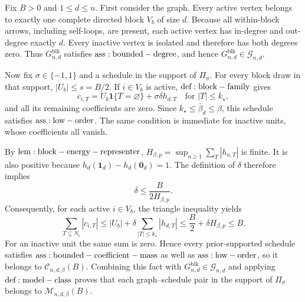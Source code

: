 Fix \(B>0\) and \(1\le d\le n\). First consider the graph. Every active vertex belongs to exactly one complete directed block \(V_b\) of size \(d\). Because all within-block arrows, including self-loops, are present, each active vertex has in-degree and out-degree exactly \(d\). Every inactive vertex is isolated and therefore has both degrees zero. Thus \(G_{n,d}^{\mathrm{blk}}\) satisfies \({\rm ass:bounded-degree}\), and hence \(G_{n,d}^{\mathrm{blk}}\in\mathcal G_{n,d}\).

Now fix \(\sigma\in\{-1,1\}\) and a schedule in the support of \(\Pi_\sigma\). For every block draw in that support, \(|U_b|\le s=B/2\). If \(i\in V_b\) is active, \({\rm def:block-family}\) gives
\[
c_{i,T}=U_b\mathbf 1\{T=\varnothing\}+\sigma\delta h_{d,T}\quad\text{for }|T|\le k_\star,
\]
and all its remaining coefficients are zero. Since \(k_\star\le\bar\beta_d\le\beta\), this schedule satisfies \({\rm ass:low-order}\). The same condition is immediate for inactive units, whose coefficients all vanish.

By \({\rm lem:block-energy-representer}\), \(H_{\beta,p}=\sup_{a\ge1}\sum_T|h_{a,T}|\) is finite. It is also positive because \(h_d(\mathbf 1_d)-h_d(\mathbf 0_d)=1\). The definition of \(\delta\) therefore implies
\[
\delta\le \frac{B}{2H_{\beta,p}}.
\]
Consequently, for each active \(i\in V_b\), the triangle inequality yields
\[
\sum_{T\subseteq N_i}|c_{i,T}|
\le |U_b|+\delta\sum_{|T|\le k_\star}|h_{d,T}|
\le \frac B2+\delta H_{\beta,p}
\le B.
\]
For an inactive unit the same sum is zero. Hence every prior-supported schedule satisfies \({\rm ass:bounded-coefficient-mass}\) as well as \({\rm ass:low-order}\), so it belongs to \(\mathcal C_{n,d,\beta}(B)\). Combining this fact with \(G_{n,d}^{\mathrm{blk}}\in\mathcal G_{n,d}\) and applying \({\rm def:model-class}\) proves that each graph--schedule pair in the support of \(\Pi_\sigma\) belongs to \(\mathcal M_{n,d,\beta}(B)\).